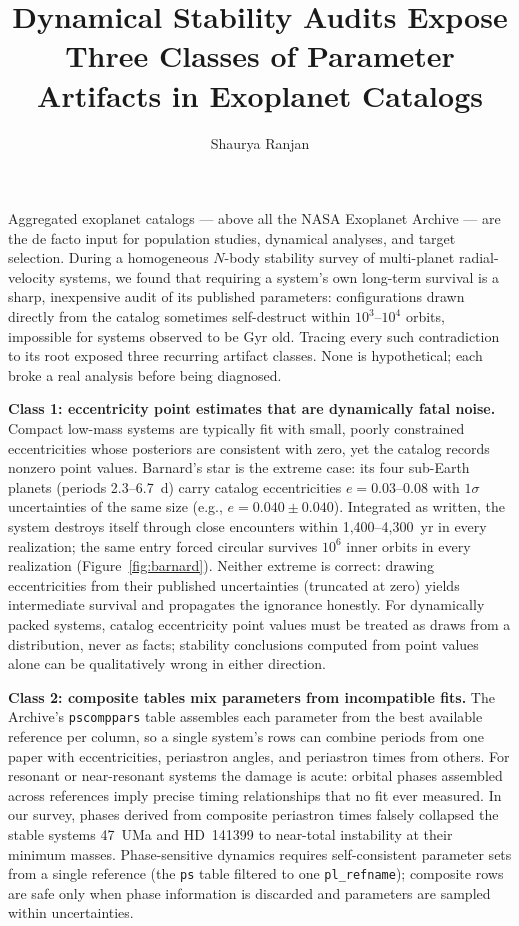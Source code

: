 \documentclass[RNAAS]{aastex631}
\begin{document}
\title{Dynamical Stability Audits Expose Three Classes of Parameter Artifacts in Exoplanet Catalogs}

\author{Shaurya Ranjan}

\section*{}

Aggregated exoplanet catalogs --- above all the NASA Exoplanet Archive ---
are the de facto input for population studies, dynamical analyses, and
target selection. During a homogeneous $N$-body stability survey of
multi-planet radial-velocity systems, we found that requiring a system's
own long-term survival is a sharp, inexpensive audit of its published
parameters: configurations drawn directly from the catalog sometimes
self-destruct within $10^3$--$10^4$ orbits, impossible for systems
observed to be Gyr old. Tracing every such contradiction to its root
exposed three recurring artifact classes. None is hypothetical; each
broke a real analysis before being diagnosed.

\textbf{Class 1: eccentricity point estimates that are dynamically fatal
noise.} Compact low-mass systems are typically fit with small, poorly
constrained eccentricities whose posteriors are consistent with zero, yet
the catalog records nonzero point values. Barnard's star is the extreme
case: its four sub-Earth planets (periods 2.3--6.7~d) carry catalog
eccentricities $e = 0.03$--$0.08$ with $1\sigma$ uncertainties of the
same size (e.g., $e = 0.040 \pm 0.040$). Integrated as written, the
system destroys itself through close encounters within
1{,}400--4{,}300~yr in every realization; the same entry forced circular
survives $10^6$ inner orbits in every realization
(Figure~\ref{fig:barnard}). Neither extreme is correct: drawing
eccentricities from their published uncertainties (truncated at zero)
yields intermediate survival and propagates the ignorance honestly. For
dynamically packed systems, catalog eccentricity point values must be
treated as draws from a distribution, never as facts; stability
conclusions computed from point values alone can be qualitatively wrong
in either direction.

\textbf{Class 2: composite tables mix parameters from incompatible
fits.} The Archive's \texttt{pscomppars} table assembles each parameter
from the best available reference per column, so a single system's rows
can combine periods from one paper with eccentricities, periastron
angles, and periastron times from others. For resonant or near-resonant
systems the damage is acute: orbital phases assembled across references
imply precise timing relationships that no fit ever measured. In our
survey, phases derived from composite periastron times falsely collapsed
the stable systems 47~UMa and HD~141399 to near-total instability at
their minimum masses. Phase-sensitive dynamics requires self-consistent
parameter sets from a single reference (the \texttt{ps} table filtered to
one \texttt{pl\_refname}); composite rows are safe only when phase
information is discarded and parameters are sampled within uncertainties.
\end{document}
